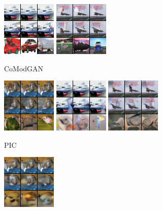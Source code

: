 \begin{figure}[t]
\begin{subfigure}[t]{0.17\textwidth}
      \includegraphics[height=\cifarimgheight]{figs/cigcvae/image-samples/cifar10/freeform_co_mod_gan_1_samples}
      \includegraphics[height=\cifarimgheight]{figs/cigcvae/image-samples/cifar10/freeform_co_mod_gan_3_samples}
      \caption{\scriptsize CoModGAN}
    \end{subfigure}
    \begin{subfigure}[t]{0.17\textwidth}
      \centering
      \includegraphics[height=\cifarimgheight]{figs/cigcvae/image-samples/cifar10/freeform_pic_0_samples}
      \includegraphics[height=\cifarimgheight]{figs/cigcvae/image-samples/cifar10/freeform_pic_1_samples}
      \includegraphics[height=\cifarimgheight]{figs/cigcvae/image-samples/cifar10/freeform_pic_3_samples}
      \caption{\scriptsize PIC}
    \end{subfigure}
    \begin{subfigure}[t]{0.17\textwidth}
      \centering
      \includegraphics[height=\cifarimgheight]{figs/cigcvae/image-samples/cifar10/freeform_anp_0_samples}

\end{subfigure}
\end{figure}
